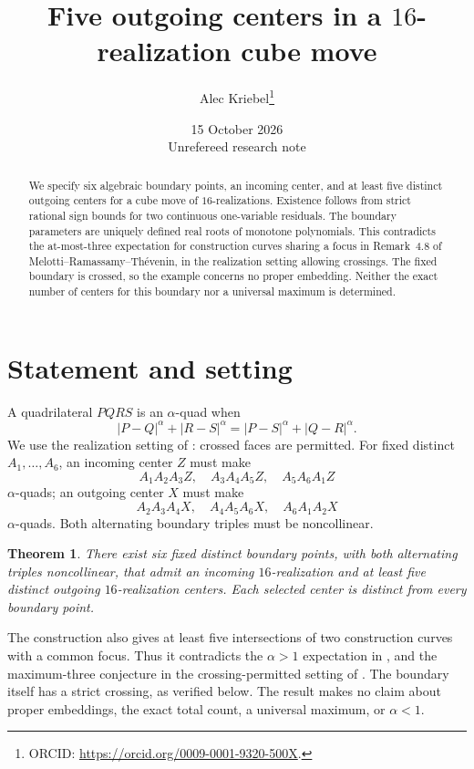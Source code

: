 \documentclass[11pt]{article}
\title{Five outgoing centers in a $16$-realization cube move}
\author{Alec Kriebel\thanks{ORCID: \url{https://orcid.org/0009-0001-9320-500X}.}}
\date{15 October 2026\\\small Unrefereed research note}
\newtheorem{theorem}{Theorem}
\begin{document}
\maketitle
\begin{abstract}
We specify six algebraic boundary points, an incoming center, and at least five distinct outgoing centers for a cube move of $16$-realizations. Existence follows from strict rational sign bounds for two continuous one-variable residuals. The boundary parameters are uniquely defined real roots of monotone polynomials. This contradicts the at-most-three expectation for construction curves sharing a focus in Remark~4.8 of Melotti--Ramassamy--Th\'evenin, in the realization setting allowing crossings. The fixed boundary is crossed, so the example concerns no proper embedding. Neither the exact number of centers for this boundary nor a universal maximum is determined.
\end{abstract}

\section{Statement and setting}
A quadrilateral $PQRS$ is an $\alpha$-quad when
\[
 |P-Q|^\alpha+|R-S|^\alpha=|P-S|^\alpha+|Q-R|^\alpha.
\]
We use the realization setting of \cite[Definitions~2.1, 2.4--2.5]{MRT}: crossed faces are permitted. For fixed distinct $A_1,\ldots,A_6$, an incoming center $Z$ must make
\[
 A_1A_2A_3Z,\quad A_3A_4A_5Z,\quad A_5A_6A_1Z
\]
$\alpha$-quads; an outgoing center $X$ must make
\[
 A_2A_3A_4X,\quad A_4A_5A_6X,\quad A_6A_1A_2X
\]
$\alpha$-quads. Both alternating boundary triples must be noncollinear.

\begin{theorem}\label{thm:main}
There exist six fixed distinct boundary points, with both alternating triples noncollinear, that admit an incoming $16$-realization and at least five distinct outgoing $16$-realization centers. Each selected center is distinct from every boundary point.
\end{theorem}

The construction also gives at least five intersections of two construction curves with a common focus. Thus it contradicts the $\alpha>1$ expectation in \cite[Remark~4.8, p.~811]{MRT}, and the maximum-three conjecture in the crossing-permitted setting of \cite[p.~1785]{OWR}. The boundary itself has a strict crossing, as verified below. The result makes no claim about proper embeddings, the exact total count, a universal maximum, or $\alpha<1$.
\end{document}
